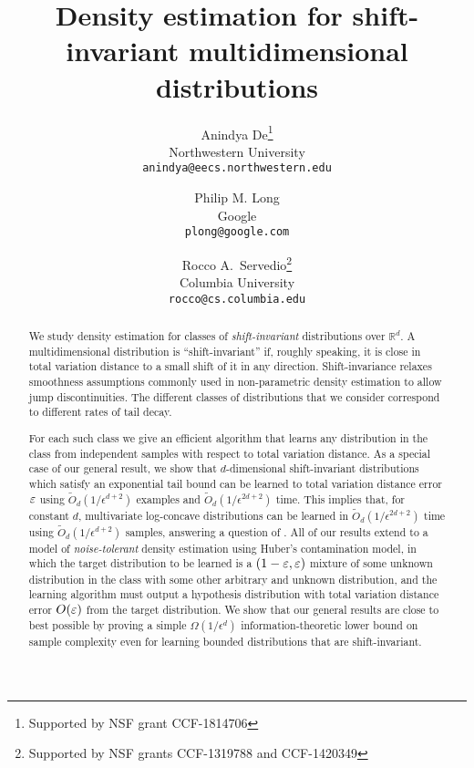 \documentclass[11pt]{article}
\title{Density estimation
                   for shift-invariant multidimensional 
                   distributions}
\author{
Anindya De\thanks{Supported by NSF grant CCF-1814706}\\
Northwestern University\\
{\tt anindya@eecs.northwestern.edu}
\and
Philip M. Long\\
Google\\
{\tt plong@google.com}
\and
\and Rocco A.~Servedio\thanks{Supported by NSF grants CCF-1319788 and CCF-1420349}\\
Columbia University \\
{\tt rocco@cs.columbia.edu}
}
\date{}
\begin{document}
\maketitle

\begin{abstract}
We study density estimation for  classes of \emph{shift-invariant} distributions over $\mathbb{R}^d$.  A multidimensional distribution is ``shift-invariant'' if, roughly  speaking, it is close in total variation distance to a small shift of it in any direction.  
Shift-invariance relaxes smoothness assumptions commonly used in
non-parametric density estimation to allow jump discontinuities.  
The different classes of distributions that we consider correspond to different rates of tail decay.

For each such class we give an efficient algorithm that learns any distribution in the class from independent samples with respect to total variation distance.  As a special case of our general result, we show that $d$-dimensional shift-invariant distributions which satisfy an exponential tail bound can be learned to total variation distance error $\varepsilon$ using $\tilde{O}_d(1/ \epsilon^{d+2})$ examples and $\tilde{O}_d(1/ \epsilon^{2d+2})$ time.  This implies that, for constant $d$, multivariate log-concave distributions can be learned in $\tilde{O}_d(1/\epsilon^{2d+2})$ time using $\tilde{O}_d(1/\epsilon^{d+2})$ samples, answering a question of  \citep{diakonikolas2016learning}. 
All of our results extend to a model of \emph{noise-tolerant} density estimation using Huber's contamination model, in which the target distribution to be learned is a $(1-\varepsilon,\varepsilon)$ mixture of some unknown distribution in the class with some other arbitrary and unknown distribution, and the learning algorithm must output a hypothesis distribution with total variation distance error $O(\varepsilon)$ from the target distribution.  We show that our general results are close to best possible by proving a simple $\Omega\left(1/\epsilon^d\right)$ information-theoretic lower bound on sample complexity even for learning bounded distributions that are shift-invariant.
\end{abstract}






\end{document}
